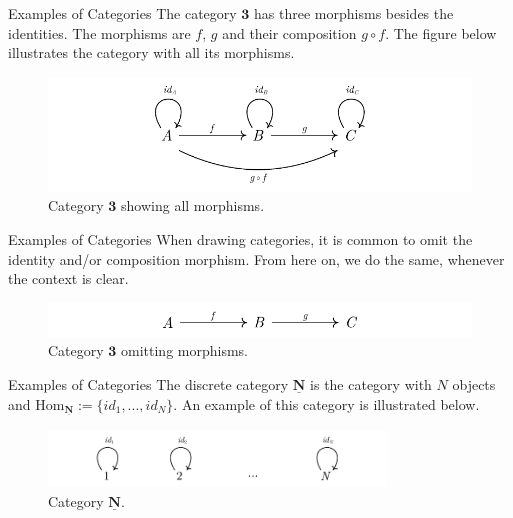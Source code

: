 \documentclass[aspectratio=169,xcolor=dvipsnames,10pt]{beamer}
\theoremstyle{definition}
\begin{document}
\begin{frame}[fragile]{Examples of Categories}
	The category $\bm 3$ has three morphisms besides the identities. The morphisms are
	$f$, $g$ and their composition $g \circ f$. The figure below
	illustrates the category with all its morphisms.
	\bigskip
	\begin{figure}[H]
		\begin{center}
			\includegraphics[width=1.00\textwidth]{./figs/3Cat.pdf}
		\end{center}
		\caption{Category $\bm 3$ showing all morphisms.}
		\label{fig:3Catcomplete}
	\end{figure}
\end{frame}

\begin{frame}[fragile]{Examples of Categories}
    When drawing categories, it is common to omit
    the identity and/or composition morphism. From here on,
    we do the same, whenever the context is clear.
	\bigskip
	\begin{figure}[H]
		\begin{center}
			\includegraphics[width=1.00\textwidth]{../notebooks/3Catsimple.pdf}
		\end{center}
		\caption{Category $\bm 3$ omitting morphisms.}
		\label{fig:3Catcomplete}
	\end{figure}
\end{frame}

\begin{frame}[fragile]{Examples of Categories}
	The discrete category $\mathbf{\underline{N}}$ is the category with $N$ objects
    and $\text{Hom}_{\mathbf{\underline{N}}} := \{id_1,...,id_N\}$. An example of this category is
	illustrated below.
	\bigskip
	\begin{figure}[H]
		\begin{center}
			\includegraphics[width=0.80\textwidth]{../notebooks/DiscreteCategory.pdf}
		\end{center}
        \caption{Category $\mathbf{\underline{N}}$.}
		\label{fig:3Catcomplete}
	\end{figure}
\end{frame}
\end{document}
